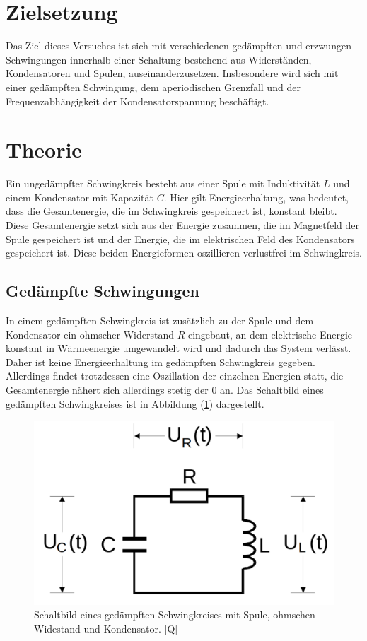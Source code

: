 \section{Zielsetzung}
\label{sec:Zielsetzung}
Das Ziel dieses Versuches ist sich mit verschiedenen gedämpften und erzwungen Schwingungen innerhalb einer Schaltung
 bestehend aus Widerständen, Kondensatoren und Spulen, auseinanderzusetzen. Insbesondere wird sich mit einer gedämpften Schwingung, dem aperiodischen 
 Grenzfall und der Frequenzabhängigkeit der Kondensatorspannung beschäftigt. 
\section{Theorie}
\label{sec:Theorie}
Ein ungedämpfter Schwingkreis besteht aus einer Spule mit Induktivität $L$ und einem Kondensator mit Kapazität $C$. Hier gilt Energieerhaltung, was bedeutet, 
dass die Gesamtenergie, die im Schwingkreis gespeichert ist, konstant bleibt. Diese Gesamtenergie setzt sich aus der Energie zusammen, die im Magnetfeld der Spule
gespeichert ist und der Energie, die im elektrischen Feld des Kondensators gespeichert ist. Diese beiden Energieformen oszillieren verlustfrei im Schwingkreis. 

\subsection{Gedämpfte Schwingungen}
In einem gedämpften Schwingkreis ist zusätzlich zu der Spule und dem Kondensator ein ohmscher Widerstand $R$ eingebaut, an dem elektrische Energie konstant in 
Wärmeenergie umgewandelt wird und dadurch das System verlässt. Daher ist keine Energieerhaltung im gedämpften Schwingkreis gegeben. Allerdings findet trotzdessen eine 
Oszillation der einzelnen Energien statt, die Gesamtenergie nähert sich allerdings stetig der $0$ an. Das Schaltbild eines gedämpften Schwingkreises ist in Abbildung (\ref{pic:Gedaempfter_Schwingkreis})
dargestellt. 
\begin{figure}[H]
    \centering
    \includegraphics[width=0.5\linewidth]{Gedaempfter_Schwingkreis.png}
    \caption{Schaltbild eines gedämpften Schwingkreises mit Spule, ohmschen Widestand und Kondensator. [Q\cite{anleitungV354}]}
    \label{pic:Gedaempfter_Schwingkreis}
\end{figure}

